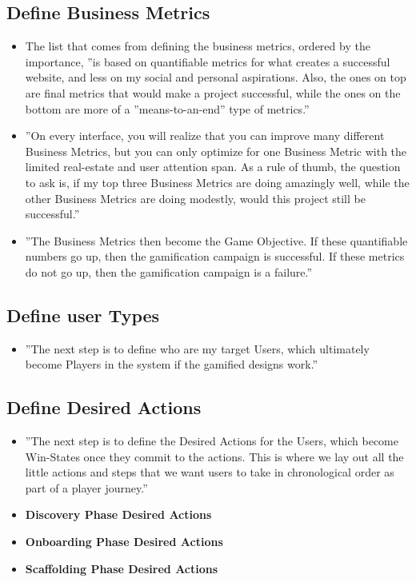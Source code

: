 \subsection{Define Business Metrics}
\begin{itemize}
    \item The list that comes from defining the business metrics, ordered by the importance, ''is based on quantifiable metrics for what creates a successful website, and less on my social and personal aspirations. Also, the ones on top are final metrics that would make a project successful, while the ones on the bottom are more of a ''means-to-an-end'' type of metrics.''
    \item ''On every interface, you will realize that you can improve many different Business Metrics, but you can only optimize for one Business Metric with the limited real-estate and user attention span. As a rule of thumb, the question to ask is, if my top three Business Metrics are doing amazingly well, while the other Business Metrics are doing modestly, would this project still be successful.''
    \item ''The Business Metrics then become the Game Objective. If these quantifiable numbers go up, then the gamification campaign is successful. If these metrics do not go up, then the gamification campaign is a failure.''
\end{itemize}

\subsection{Define user Types}
\begin{itemize}
    \item ''The next step is to define who are my target Users, which ultimately become Players in the system if the gamified designs work.''
\end{itemize}

\subsection{Define Desired Actions}
\begin{itemize}
    \item ''The next step is to define the Desired Actions for the Users, which become Win-States once they commit to the actions. This is where we lay out all the little actions and steps that we want users to take in chronological order as part of a player journey.''
    \item \textbf{Discovery Phase Desired Actions}
    \item \textbf{Onboarding Phase Desired Actions}
    \item \textbf{Scaffolding Phase Desired Actions}
\end{itemize}

